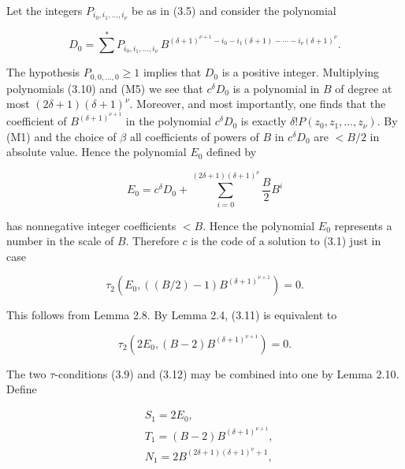 \documentclass[11pt,a4paper]{article}
\newcommand{\origpage}[1]{\marginnote{\footnotesize\textbf{[#1]}}}
\begin{document}
Let the integers $P_{i_{0}, i_{1}, \ldots, i_{\nu}}$ be as in (3.5) and consider the polynomial


\begin{equation*}
D_{0}=\sum^{*}P_{i_0,i_1,\ldots,i_\nu}\,B^{(\delta+1)^{\nu+1}-i_0-i_1(\delta+1)-\cdots-i_\nu(\delta+1)^\nu}. \tag{M5}
\end{equation*}


\origpage{562}The hypothesis $P_{0,0, \ldots, 0} \geq 1$ implies that $D_{0}$ is a positive integer. Multiplying polynomials (3.10) and (M5) we see that $c^{\delta} D_{0}$ is a polynomial in $B$ of degree at most $(2 \delta+1)(\delta+1)^{\nu}$. Moreover, and most importantly, one finds that the coefficient of $B^{(\delta+1)^{\nu+1}}$ in the polynomial $c^{\delta} D_{0}$ is exactly $\delta!P\left(z_{0},\allowbreak  z_{1},\allowbreak  \ldots,\allowbreak  z_{\nu}\right)$. By (M1) and the choice of $\beta$ all coefficients of powers of $B$ in $c^{\delta} D_{0}$ are $<B / 2$ in absolute value. Hence the polynomial $E_{0}$ defined by


\begin{equation*}
E_{0}=c^{\delta} D_{0}+\sum_{i=0}^{(2 \delta+1)(\delta+1)^{\nu}} \frac{B}{2} B^{i} \tag{M6}
\end{equation*}


has nonnegative integer coefficients $<B$. Hence the polynomial $E_{0}$ represents a number in the scale of $B$. Therefore $c$ is the code of a solution to (3.1) just in case


\begin{equation*}
\tau_{2}\left(E_{0},((B / 2)-1) B^{(\delta+1)^{\nu+1}}\right)=0 . \tag{3.11}
\end{equation*}


This follows from Lemma 2.8. By Lemma 2.4, (3.11) is equivalent to


\begin{equation*}
\tau_{2}\left(2 E_{0},(B-2) B^{(\delta+1)^{\nu+1}}\right)=0 . \tag{3.12}
\end{equation*}


The two $\tau$-conditions (3.9) and (3.12) may be combined into one by Lemma 2.10. Define


\begin{align*}
& S_{1}=2 E_{0},  \tag{M7}\\
& T_{1}=(B-2) B^{(\delta+1)^{\nu+1}},  \tag{M8}\\
& N_{1}=2B^{(2\delta+1)(\delta+1)^\nu+1}, \tag{M9}
\end{align*}
\end{document}
